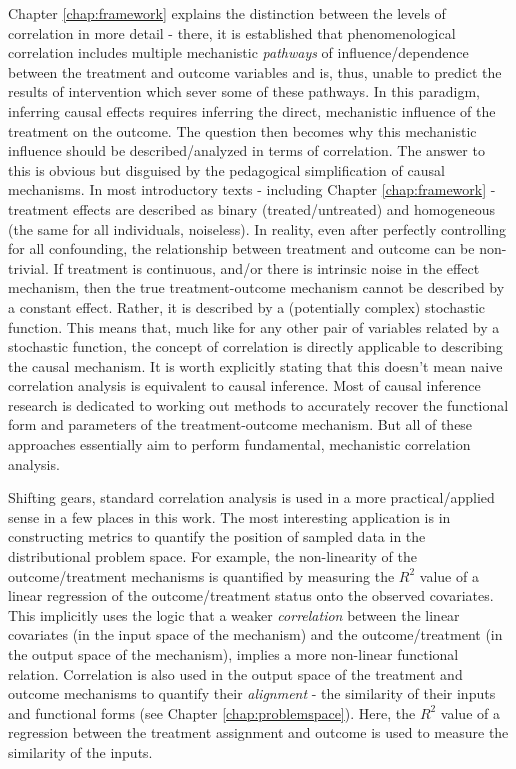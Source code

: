 \documentclass[./main.tex]{subfiles}
\begin{document}
\vspace{\baselineskip}

Chapter \ref{chap:framework} explains the distinction between the levels of correlation in more detail - there, it is established that phenomenological correlation includes multiple mechanistic \textit{pathways} of influence/dependence between the treatment and outcome variables and is, thus, unable to predict the results of intervention which sever some of these pathways. In this paradigm, inferring causal effects requires inferring the direct, mechanistic influence of the treatment on the outcome. The question then becomes why this mechanistic influence should be described/analyzed in terms of correlation. The answer to this is obvious but disguised by the pedagogical simplification of causal mechanisms. In most introductory texts - including Chapter \ref{chap:framework} - treatment effects are described as binary (treated/untreated) and homogeneous (the same for all individuals, noiseless). In reality, even after perfectly controlling for all confounding, the relationship between treatment and outcome can be non-trivial. If treatment is continuous, and/or there is intrinsic noise in the effect mechanism, then the true treatment-outcome mechanism cannot be described by a constant effect. Rather, it is described by a (potentially complex) stochastic function. This means that, much like for any other pair of variables related by a stochastic function, the concept of correlation is directly applicable to describing the causal mechanism. It is worth explicitly stating that this doesn't mean naive correlation analysis is equivalent to causal inference. Most of causal inference research is dedicated to working out methods to accurately recover the functional form and parameters of the treatment-outcome mechanism. But all of these approaches essentially aim to perform fundamental, mechanistic correlation analysis.

\vspace{\baselineskip}

Shifting gears, standard correlation analysis is used in a more practical/applied sense in a few places in this work. The most interesting application is in constructing metrics to quantify the position of sampled data in the distributional problem space. For example, the non-linearity of the outcome/treatment mechanisms is quantified by measuring the $R^2$ value of a linear regression of the outcome/treatment status onto the observed covariates. This implicitly uses the logic that a weaker \textit{correlation} between the linear covariates (in the input space of the mechanism) and the outcome/treatment (in the output space of the mechanism), implies a more non-linear functional relation. Correlation is also used in the output space of the treatment and outcome mechanisms to quantify their \textit{alignment} - the similarity of their inputs and functional forms (see Chapter \ref{chap:problemspace}). Here, the $R^2$ value of a regression between the treatment assignment and outcome is used to measure the similarity of the inputs.
\end{document}
